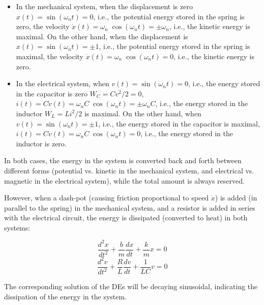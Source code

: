 \documentclass{article}
\begin{document}
\begin{itemize}
\item In the mechanical system, when the displacement is zero $x(t)
  =\sin(\omega_n t)=0$, i.e., the potential energy stored in the spring 
  is zero, the velocity $\dot{x}(t)=\omega_n\;\cos(\omega_n t)=\pm \omega_n$,
  i.e., the kinetic energy is maximal. On the other hand, when the 
  displacement is $x(t)=\sin(\omega_n t)=\pm 1$, i.e., the potential 
  energy stored in the spring is maximal, the velocity $\dot{x}(t)=\omega_n
  \;\cos(\omega_n t)=0$, i.e., the kinetic energy is zero.
\item In the electrical system, when $v(t)=\sin(\omega_n t)=0$, i.e., the
  energy stored in the capacitor is zero $W_C=Cv^2/2=0$,
  $i(t)=C\dot{v}(t)=\omega_n C\;\cos(\omega_n t)=\pm \omega_n C$, i.e., 
  the energy stored in the inductor $W_L=Li^2/2$ is maximal. On the other
  hand, when $v(t)=\sin(\omega_n t)=\pm 1$, i.e., the energy stored in the 
  capacitor is maximal, $i(t)=C\dot{v}(t)=\omega_n C\;\cos(\omega_n t)=0$,
  i.e., the energy stored in the inductor is zero. 
\end{itemize}
In both cases, the energy in the system is converted back and forth 
between different forms (potential vs. kinetic in the mechanical system,
and electrical vs. magnetic in the electrical system), while the total
amount is always reserved. 

However, when a dash-pot (causing friction proportional to speed $\dot{x}$)
is added (in parallel to the spring) in the mechanical system, and a resistor 
is added in series with the electrical circuit, the energy is dissipated 
(converted to heat) in both systems:

\begin{equation}
  \frac{d^2x}{dt^2}+\frac{b}{m}\frac{dx}{dt}+\frac{k}{m}x=0	
\end{equation}
\begin{equation}
  \frac{d^2v}{dt^2}+\frac{R}{L}\frac{dv}{dt}+\frac{1}{LC}v=0	
\end{equation}


The corresponding solution of the DEs will be decaying sinusoidal,
indicating the dissipation of the energy in the system.
\end{document}
